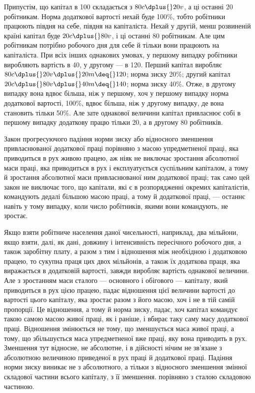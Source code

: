 Припустім, що капітал в 100 складається з $80c \dplus{} 20v$, а ці
останні \deq{} 20 робітникам. Норма додаткової вартості нехай буде
100\%, тобто робітники працюють півдня на себе, півдня на капіталіста.
Нехай у другій, менш розвиненій країні капітал буде
$20c \dplus{} 80v$, і ці останні \deq{} 80 робітникам. Але цим робітникам потрібно
 робочого дня для себе й тільки  вони працюють на
капіталіста. При всіх інших однакових умовах, у першому випадку
робітники виробляють вартість в 40, у другому — в 120.
Перший капітал виробляє $80c \dplus{} 20v \dplus{} 20m \deq{} 120$; норма зиску \deq{}
20\%; другий капітал $20c \dplus{} 80v \dplus{} 40m \deq{} 140$; норма зиску \deq{}
\deq{} 40\%. Отже, в другому випадку вона вдвоє більша, ніж у першому,
хоч у першому випадку норма додаткової вартості, \deq{} 100\%,
вдвоє більша, ніж у другому випадку, де вона становить тільки
50\%. Але зате однакової величини капітал привласнює собі в першому
випадку додаткову працю тільки 20, а в другому 80 робітників.

Закон прогресуючого падіння норми зиску або відносного
зменшення привласнюваної додаткової праці порівняно з масою
упредметненої праці, яка приводиться в рух живою працею, аж
ніяк не виключає зростання абсолютної маси праці, яка приводиться
в рух і експлуатується суспільним капіталом, а тому й зростання
абсолютної маси привласнюваної ним додаткової праці; так само
цей закон не виключає того, що капітали, які є в розпорядженні
окремих капіталістів, командують дедалі більшою масою праці,
а тому й додаткової праці, — останнє навіть у тому випадку,
коли число робітників, якими вони командують, не зростає.

Якщо взяти робітниче населення даної чисельності, наприклад,
два мільйони, якщо взяти, далі, як дані, довжину і інтенсивність
пересічного робочого дня, а також заробітну плату,
а разом з тим і відношення між необхідною і додатковою працею,
то сукупна праця цих двох мільйонів, а також їх додаткова
праця, яка виражається в додатковій вартості, завжди виробляє
вартість однакової величини. Але з зростанням маси сталого
— основного і обігового — капіталу, який приводиться в рух
цією працею, падає відношення цієї величини вартості до вартості
цього капіталу, яка зростає разом з його масою, хоч і не в тій
самій пропорції. Це відношення, а тому й норма зиску, падає, хоч
капітал командує такою самою масою живої праці, як і раніше,
і вбирає таку саму масу додаткової праці. Відношення змінюється
не тому, що зменшується маса живої праці, а тому, що збільшується
маса упредметненої вже праці, яку вона приводить в рух.
Зменшення тут відносне, не абсолютне, і в дійсності нічим
не зв’язане з абсолютною величиною приведеної в рух праці
й додаткової праці. Падіння норми зиску виникає не з абсолютного,
а тільки з відносного зменшення змінної складової частини
всього капіталу, з її зменшення. порівняно з сталою складовою
частиною.

